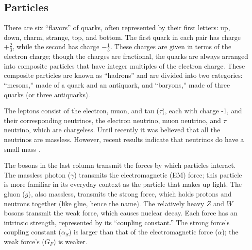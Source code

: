 \subsection{Particles}
\label{theory:particles}
There are six ``flavors'' of quarks, 
often represented by their first letters: 
up, down, charm, strange, top, and bottom.  
The first quark in each pair has charge $+\frac{2}{3}$, 
while the second has charge $-\frac{1}{3}$.  
These charges are given in terms of the electron charge; 
though the charges are fractional, 
the quarks are always arranged into composite 
particles that have integer multiples of the electron charge.  
These composite particles are known as ``hadrons'' 
and are divided into two categories: 
``mesons,'' made of a quark and an antiquark, 
and ``baryons,'' made of three quarks 
(or three antiquarks).  

The leptons consist of the electron, muon, and tau ($\tau$), 
each with charge -1, 
and their corresponding neutrinos, 
the electron neutrino, muon neutrino, and $\tau$ neutrino, 
which are chargeless.  
Until recently it was believed that all the neutrinos are massless.  
However, recent 
results 
indicate 
that neutrinos do have a small mass 
\cite{neutrinoMixing}.  

The bosons in the last column transmit the forces 
by which particles interact.  
The massless photon ($\gamma$) transmits the 
electromagnetic (EM) force; 
this particle is more familiar in its 
everyday context as the particle that makes up light.  
The gluon ($g$), also massless, transmits the strong force, 
which holds protons and neutrons together     %
(like glue, hence the name).  
The relatively heavy $Z$ and $W$ bosons 
transmit the weak force, 
which causes nuclear decay.  
Each force has an intrinsic strength, %
represented by its ``coupling constant.''  
The strong force's coupling constant ($\alpha_S$)
is larger than that 
of the electromagnetic force ($\alpha$); 
the weak force's ($G_F$) is weaker.  

